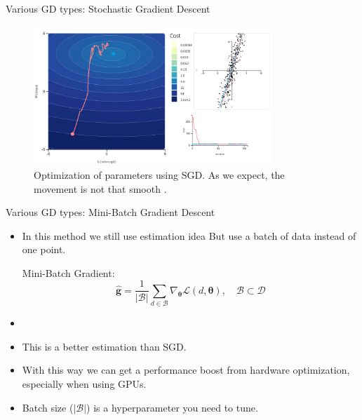\documentclass[compress,oilve,t]{beamer}
\newcommand{\tc}[2]{
	\textcolor{#1}{\hspace{-2pt}#2\hspace{-2pt}}
}
\begin{document}
\begin{frame}{Various GD types: Stochastic Gradient Descent}
	\begin{figure}[H]
		\centering
		\includegraphics[width=0.8\textwidth]{Figs/sgd.png}
		\caption{Optimization of parameters using SGD. As we expect, the movement is not that smooth \cite{katanforoosh-kunin-opt}.}
	\end{figure} 
\end{frame}

\begin{frame}{Various GD types: Mini-Batch Gradient Descent}
	\begin{itemize}
		\item In this method we still use estimation idea But use \tc{keywords}{a batch of data} instead of one point.
		\begin{block}{Mini-Batch Gradient:}
			\[
			\hat{\bm{g}} = \frac{1}{|\mathcal{B}|} \sum_{d\in\mathcal{B}} \nabla_{\bm{\theta}} \mathcal{L}(d, \bm{\theta}), \quad \mathcal{B} \subset \mathcal{D}
			\]
		\end{block}
		\item[]
		\item This is a better estimation than SGD.
		\item With this way we can get a performance boost from hardware optimization, especially when using GPUs.
		\item Batch size ($|\mathcal{B}|$) is a hyperparameter you need to tune.
	\end{itemize}
\end{frame}
\end{document}

